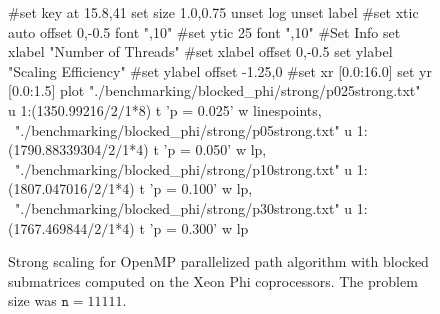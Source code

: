 \documentclass[11pt]{article}
\begin{document}
\begin{figure}[h]
	\begin{center}
		\begin{gnuplot}[terminal=cairolatex, terminaloptions= color] 
			#set key at 15.8,41
			set size 1.0,0.75              
			unset log                          
			unset label                          
			#set xtic auto offset 0,-0.5 font ",10"                     
			#set ytic 25 font ",10" 
			#Set Info
			set xlabel "Number of Threads"
			#set xlabel offset 0,-0.5
			set ylabel "Scaling Efficiency"
			#set ylabel offset -1.25,0
			#set xr [0.0:16.0]
			set yr [0.0:1.5]
			plot "./benchmarking/blocked_phi/strong/p025strong.txt" u 1:(1350.99216/$2/$1*8) t 'p = 0.025' w linespoints, \
			"./benchmarking/blocked_phi/strong/p05strong.txt" u 1:(1790.88339304/$2/$1*4) t 'p = 0.050' w lp, \
			"./benchmarking/blocked_phi/strong/p10strong.txt" u 1:(1807.047016/$2/$1*4) t 'p = 0.100' w lp, \
			"./benchmarking/blocked_phi/strong/p30strong.txt" u 1:(1767.469844/$2/$1*4) t 'p = 0.300' w lp
		\end{gnuplot}
		\caption{Strong scaling for OpenMP parallelized path algorithm with blocked submatrices computed on the Xeon Phi coprocessors. The problem size was $\mathtt{n} = 11111$.}
		\label{blocked_device_ss}
	\end{center}
\end{figure}
\end{document}
